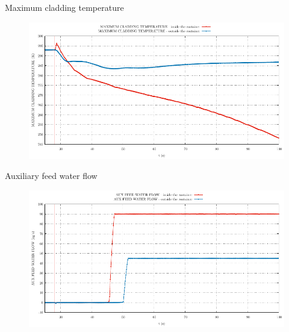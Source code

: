 \begin{frame}{Maximum cladding temperature}
	\begin{figure}
			\centering
			\includegraphics[width=\textwidth]{./graphs/MAXIMUM CLADDING TEMPERATURE_comp.pdf}
			
		\end{figure}
	
\end{frame}

\begin{frame}{Auxiliary feed water flow}
	\begin{figure}
		\centering
		\includegraphics[width=\textwidth]{./graphs/AUX FEED WATER FLOW_comp.pdf}
		
	\end{figure}
	
\end{frame}





















